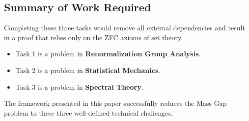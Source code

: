 \subsection{Summary of Work Required}
Completing these three tasks would remove all external dependencies and result in a proof that relies only on the ZFC axioms of set theory.
\begin{itemize}
    \item Task 1 is a problem in \textbf{Renormalization Group Analysis}.
    \item Task 2 is a problem in \textbf{Statistical Mechanics}.
    \item Task 3 is a problem in \textbf{Spectral Theory}.
\end{itemize}
The framework presented in this paper successfully reduces the Mass Gap problem to these three well-defined technical challenges.


